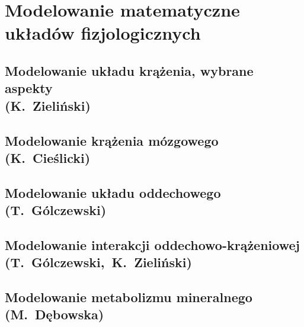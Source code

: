 \documentclass[11pt,a4paper,twoside,openright,draft]{memoir}
\begin{document}

	\frontmatter
	
	\begin{KeepFromToc}
		
		\tableofcontents
	\end{KeepFromToc}


	\mainmatter
	\pagestyle{ruled}
		
		\part{Modelowanie matematyczne układów fizjologicznych}
			
			
			
			\chapter{Modelowanie układu krążenia, wybrane aspekty \\(K.~Zieliński)}
			\chapter{Modelowanie krążenia mózgowego (K.~Cieślicki)}
			\chapter{Modelowanie układu oddechowego (T.~Gólczewski)}
			\chapter{Modelowanie interakcji oddechowo-krążeniowej (T.~Gólczewski,~K.~Zieliński)}
			\chapter{Modelowanie metabolizmu mineralnego (M.~Dębowska)}
\end{document}
